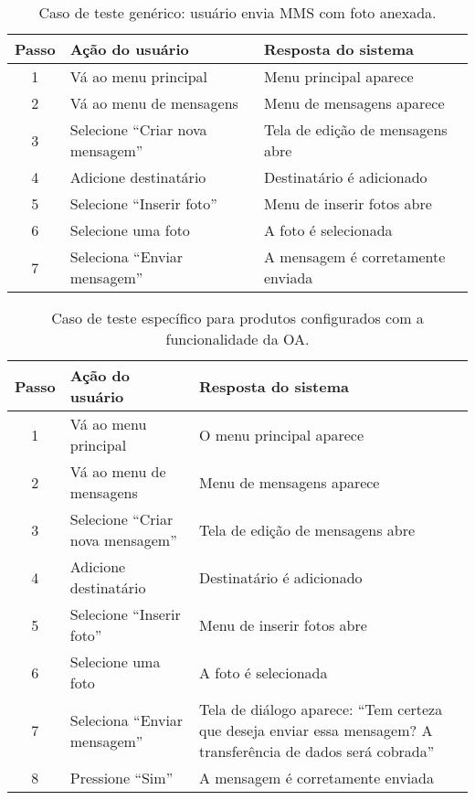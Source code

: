 \begin{table}[!t]
  \centering
  \caption{Caso de teste genérico: usuário envia MMS com foto anexada.}
    \begin{tabular}{|c|p{5cm}|p{5cm}|}
    \hline
    \textbf{Passo} & \textbf{Ação do usuário} & \textbf{Resposta do sistema}
    \\
    \hline
    1    & Vá ao menu principal  & Menu principal aparece  \\
    \hline
    2    & Vá ao menu de mensagens  & Menu de mensagens aparece  \\
    \hline
    3    & Selecione ``Criar nova mensagem''  & Tela de edição de mensagens abre
    \\
    \hline
    4    & Adicione destinatário  & Destinatário é adicionado
    \\
    \hline
    5    & Selecione ``Inserir foto''  & Menu de inserir fotos abre
    \\
    \hline
    6    & Selecione uma foto  & A foto é selecionada \\
    \hline
    7    & Seleciona ``Enviar mensagem''  & A mensagem é corretamente enviada
    \\
    \hline
    \end{tabular}
  \label{tab:example1}
\end{table}

\begin{table} [!t]
  \centering
  \caption{Caso de teste específico para produtos configurados com a
  funcionalidade da OA.}
    \begin{tabular}{|c|p{5cm}|p{5cm}|}
    \hline
    \textbf{Passo} & \textbf{Ação do usuário} & \textbf{Resposta do sistema}
    \\
    \hline
    1    & Vá ao menu principal  & O menu principal aparece  \\
    \hline
    2    & Vá ao menu de mensagens  & Menu de mensagens aparece  \\
    \hline
    3    & Selecione ``Criar nova mensagem''  & Tela de edição de mensagens abre  \\
    \hline
    4    & Adicione destinatário  & Destinatário é adicionado \\
    \hline
    5    & Selecione ``Inserir foto''  & Menu de inserir fotos abre \\
    \hline
    6    & Selecione uma foto  & A foto é selecionada \\
    \hline
    7    & Seleciona ``Enviar mensagem''  & Tela de diálogo aparece: 
    ``Tem certeza que deseja enviar essa mensagem? A transferência de dados
    será cobrada'' \\
    \hline
    8    & Pressione ``Sim''  &  A mensagem é corretamente enviada
    \\
    \hline
    \end{tabular}
  \label{tab:specexample1}
\end{table}

